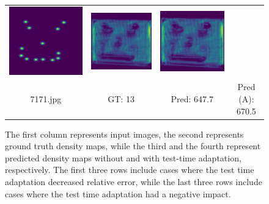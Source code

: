 \begin{figure}[htb]
\begin{tabular}{cccc}
		\includegraphics[width=0.24\linewidth]{fig/7171_gt.png} &
		\includegraphics[width=0.24\linewidth]{fig/7171_predict.png} &
		\includegraphics[width=0.24\linewidth]{fig/7171_adapt.png} \\
		7171.jpg & GT: 13 & Pred: 647.7 & Pred (A): 670.5 \\
	\end{tabular}
	\caption{The first column represents input images, the second represents ground truth density maps, while the third and the fourth represent predicted density maps without and with test-time adaptation, respectively. The first three rows include cases where the test time adaptation decreased relative error, while the last three rows include cases where the test time adaptation had a negative impact.}
	\label{fig:adaptation_effect}
\end{figure}

